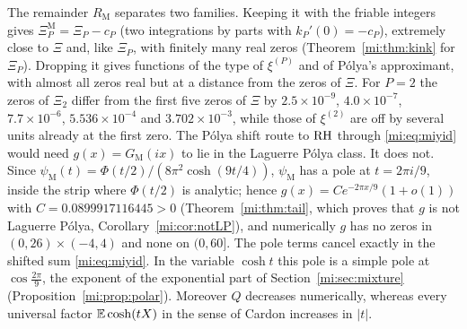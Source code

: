 The remainder $R_{\mathrm M}$ separates two families. Keeping it with the friable integers gives $\Xi_P^{\mathrm M}=\Xi_P-c_P$ (two integrations by parts with $k_P'(0)=-c_P$), extremely close to $\Xi$ and, like $\Xi_P$, with finitely many real zeros (Theorem~\ref{mi:thm:kink} for $\Xi_P$). Dropping it gives functions of the type of $\xi^{(P)}$ and of P\'olya's approximant, with almost all zeros real but at a distance from the zeros of $\Xi$. For $P=2$ the zeros of $\Xi_2$ differ from the first five zeros of $\Xi$ by $2.5\times10^{-9}$, $4.0\times10^{-7}$, $7.7\times10^{-6}$, $5.536\times10^{-4}$ and $3.702\times10^{-3}$, while those of $\xi^{(2)}$ are off by several units already at the first zero. The P\'olya shift route to $\mathrm{RH}$ through \eqref{mi:eq:miyid} would need $g(x)=G_{\mathrm M}(ix)$ to lie in the Laguerre P\'olya class. It does not. Since $\psi_{\mathrm M}(t)=\Phi(t/2)/(8\pi^2\cosh(9t/4))$, $\psi_{\mathrm M}$ has a pole at $t=2\pi i/9$, inside the strip where $\Phi(t/2)$ is analytic; hence $g(x)=Ce^{-2\pi x/9}(1+o(1))$ with $C=0.0899917116445>0$ (Theorem~\ref{mi:thm:tail}, which proves that $g$ is not Laguerre P\'olya, Corollary~\ref{mi:cor:notLP}), and numerically $g$ has no zeros in $(0,26)\times(-4,4)$ and none on $(0,60]$. The pole terms cancel exactly in the shifted sum \eqref{mi:eq:miyid}. In the variable $\cosh t$ this pole is a simple pole at $\cos\frac{2\pi}9$, the exponent of the exponential part of Section~\ref{mi:sec:mixture} (Proposition~\ref{mi:prop:polar}). Moreover $Q$ decreases numerically, whereas every universal factor $\mathbb{E}\cosh(tX)$ in the sense of Cardon \cite{Cardon2005} increases in $|t|$.

